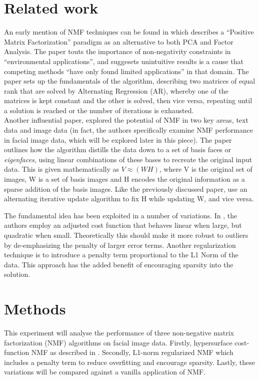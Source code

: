 \documentclass{article} %
\begin{document}
\section{Related work}
An early mention of NMF techniques can be found in \cite{paatero1994} which describes a ``Positive Matrix Factorization'' paradigm as an alternative to both PCA and Factor Analysis. The paper touts the importance of non-negativity constraints in ``environmental applications'', and suggesets unintuitive results is a cause that competing methods ``have only found limited applications'' in that domain. The paper sets up the fundamentals of the algorithm, describing two matrices of equal rank that are solved by Alternating Regression (AR), whereby one of the matrices is kept constant and the other is solved, then vice versa, repeating until a solution is reached or the number of iterations is exhausted.\\

Another influential paper, \cite{lee99} explored the potential of NMF in two key areas, text data and image data (in fact, the authors specifically examine NMF performance in facial image data, which will be explored later in this piece). The paper outlines how the algorithm distills the data down to a set of basis faces or \textit{eigenfaces}, using linear combinations of these bases to recreate the original input data. This is given mathematically as \(V \approx (WH)\), where V is the original set of images, W is a set of basis images and H encodes the original information as a sparse addition of the basis images. Like the previously discussed paper, \cite{lee99} use an alternating iterative update algorithm to fix H while updating W, and vice versa.

The fundamental idea has been exploited in a number of variations. In \cite{Hamza2006}, the authors employ an adjusted cost function that behaves linear when large, but quadratic when small. Theoretically this should make it more robust to outliers by de-emphasizing the penalty of larger error terms. Another regularization technique is to introduce a penalty term proportional to the L1 Norm of the data. This approach has the added benefit of encouraging sparsity into the solution.


\section{Methods}

This experiment will analyse the performance of three non-negative matrix factorization (NMF) algorithms on facial image data. Firstly, hypersurface cost-function NMF as described in \cite{Hamza2006}. Secondly, L1-norm regularized NMF which includes a penalty term to reduce overfitting and encourage sparsity. Lastly, these variations will be compared against a vanilla application of NMF.
\end{document}
